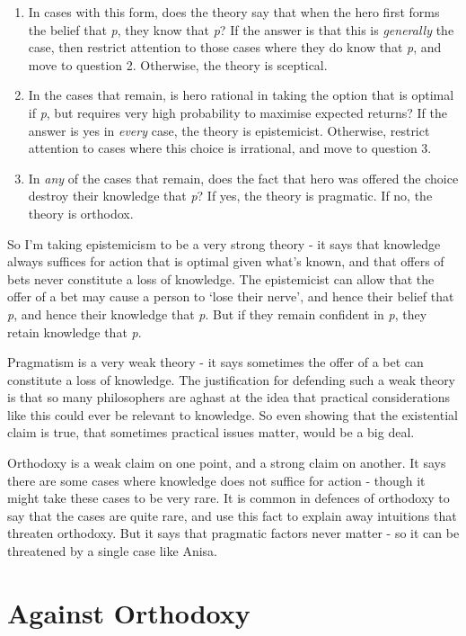 \documentclass[
  11pt,
]{book}
\providecommand{\tightlist}{%
  \setlength{\itemsep}{0pt}\setlength{\parskip}{0pt}}
\begin{document}
\begin{enumerate}
\def\labelenumi{\arabic{enumi}.}
\tightlist
\item
  In cases with this form, does the theory say that when the hero first forms the belief that \emph{p}, they know that \emph{p}? If the answer is that this is \emph{generally} the case, then restrict attention to those cases where they do know that \emph{p}, and move to question 2. Otherwise, the theory is sceptical.
\item
  In the cases that remain, is hero rational in taking the option that is optimal if \emph{p}, but requires very high probability to maximise expected returns? If the answer is yes in \emph{every} case, the theory is epistemicist. Otherwise, restrict attention to cases where this choice is irrational, and move to question 3.
\item
  In \emph{any} of the cases that remain, does the fact that hero was offered the choice destroy their knowledge that \emph{p}? If yes, the theory is pragmatic. If no, the theory is orthodox.
\end{enumerate}

So I'm taking epistemicism to be a very strong theory - it says that knowledge always suffices for action that is optimal given what's known, and that offers of bets never constitute a loss of knowledge. The epistemicist can allow that the offer of a bet may cause a person to `lose their nerve', and hence their belief that \emph{p}, and hence their knowledge that \emph{p}. But if they remain confident in \emph{p}, they retain knowledge that \emph{p}.

Pragmatism is a very weak theory - it says sometimes the offer of a bet can constitute a loss of knowledge. The justification for defending such a weak theory is that so many philosophers are aghast at the idea that practical considerations like this could ever be relevant to knowledge. So even showing that the existential claim is true, that sometimes practical issues matter, would be a big deal.

Orthodoxy is a weak claim on one point, and a strong claim on another. It says there are some cases where knowledge does not suffice for action - though it might take these cases to be very rare. It is common in defences of orthodoxy to say that the cases are quite rare, and use this fact to explain away intuitions that threaten orthodoxy. But it says that pragmatic factors never matter - so it can be threatened by a single case like Anisa.

\hypertarget{orthodox}{%
\section{Against Orthodoxy}\label{orthodox}}
\end{document}
